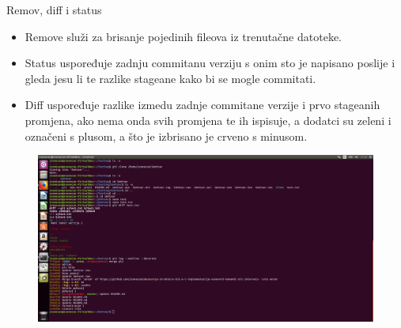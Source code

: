 \documentclass{beamer}
\begin{document}
\begin{frame}{Remov, diff i status}
	\begin{itemize}
	\item Remove služi za brisanje pojedinih fileova iz trenutačne datoteke.
	\item Status uspoređuje zadnju commitanu verziju s onim sto je napisano poslije i gleda jesu li te razlike stageane kako bi se mogle commitati.
	\item Diff uspoređuje razlike izmedu zadnje commitane verzije i prvo stageanih promjena, ako nema onda svih promjena te ih ispisuje, a dodatci su zeleni i označeni s plusom, a što je izbrisano je crveno s minusom.
	\end{itemize}
\end{frame}
\begin{frame}
\begin{figure}
\includegraphics[width=1\textwidth]{./slike/c.png}
\end{figure}
\end{frame}
\end{document}
